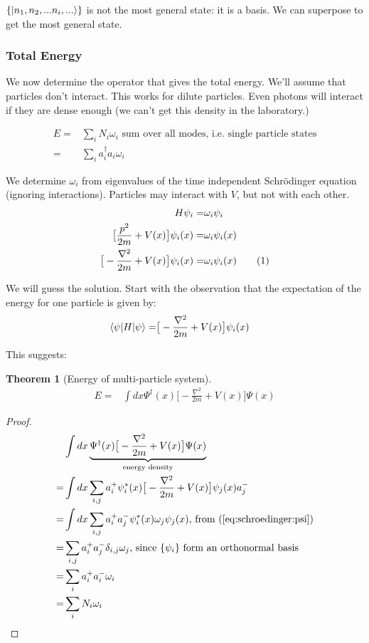 \documentclass[]{article}
\newcommand\numberthis{\addtocounter{equation}{1}\tag{\theequation}}
\newtheorem{thm}{Theorem}
\begin{document}
$\{\ket{n_1,n_2,...n_i,...}\}$ is not the most general state: it is a basis. We can superpose to get the most general state.


\subsubsection{Total Energy}
We now determine the operator that gives the total energy. We'll assume that particles don't interact. This works for dilute particles. Even photons will interact if they are dense enough (we can't get this density in the laboratory.)

\begin{align*}
	E =& \sum_{i} N_i \omega_i \text{ sum over all modes, i.e. single particle states}\\
	=& \sum_{i} a^\dagger_i a_i \omega_i
\end{align*}

We determine $\omega_i$ from eigenvalues of the time independent Schr\"odinger equation (ignoring interactions). Particles may interact with $V$, but not with each other.
\begin{align*}
	H \psi_i =& \omega_i \psi_i\\
	\big[\frac{p^2}{2m} + V(x)\big]\psi_i(x)=& \omega_i \psi_i(x)\\
	\big[-\frac{\nabla^2}{2m} + V(x)\big]\psi_i(x)=& \omega_i \psi_i(x) \numberthis \label{eq:schroedinger:psi}
\end{align*}

We will guess the solution. Start with the observation that the expectation of the energy for one particle is given by:
\begin{align*}
	\braket{\psi | H | \psi} =& \big[-\frac{\nabla^2}{2m} + V(x)\big]\psi_i(x)
\end{align*}

This suggests:
\begin{thm}[Energy of multi-particle system]
	\begin{align*}
		E=&\int dx \Psi^\dagger(x) \big[-\frac{\nabla^2}{2m} + V(x)\big] \Psi(x)
	\end{align*}
\end{thm}

\begin{proof}
	\begin{align*}
		&\int dx \underbrace{\Psi^\dagger(x) \big[-\frac{\nabla^2}{2m} + V(x)\big] \Psi(x)}_\text{energy density} \\
		=& \int dx \sum_{i,j}a^+_i\psi_i^*(x)\big[-\frac{\nabla^2}{2m} + V(x)\big]\psi_j(x)a^-_j\\
		=& \int dx \sum_{i,j} a^+_i a^-_j \psi_i^*(x) \omega_j \psi_j(x) \text{, from (\ref{eq:schroedinger:psi})}\\
		=& \sum_{i,j} a^+_i a^-_j \delta_{i,j} \omega_j \text{, since $\{\psi_i\}$ form an orthonormal basis} \\
		=& \sum_{i} a^+_i a^-_i  \omega_i\\
		=& \sum_i N_i \omega_i
	\end{align*}
\end{proof}
\end{document}
